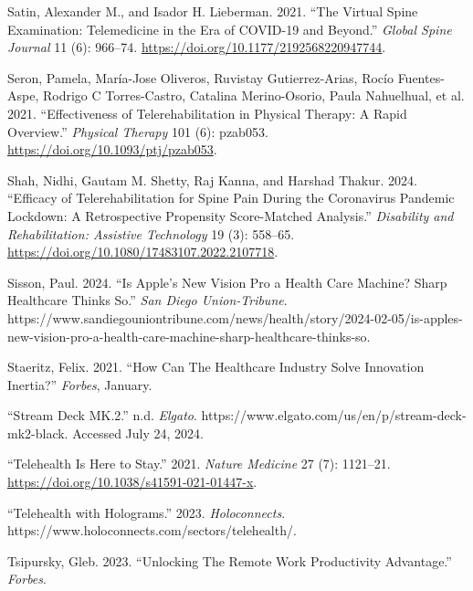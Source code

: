 \documentclass[
  letterpaper,
  DIV=11,
  numbers=noendperiod,
  oneside]{scrartcl}
\newlength{\cslhangindent}
\newenvironment{CSLReferences}[2] %
 {\begin{list}{}{%
  \setlength{\itemindent}{0pt}
  \setlength{\leftmargin}{0pt}
  \setlength{\parsep}{0pt}
  \ifodd #1
   \setlength{\leftmargin}{\cslhangindent}
   \setlength{\itemindent}{-1\cslhangindent}
  \fi
  \setlength{\itemsep}{#2\baselineskip}}}
 {\end{list}}
\begin{document}
\begin{CSLReferences}{1}{0}
Satin, Alexander M., and Isador H. Lieberman. 2021. {``The {Virtual
Spine Examination}: {Telemedicine} in the {Era} of {COVID-19} and
{Beyond}.''} \emph{Global Spine Journal} 11 (6): 966--74.
\url{https://doi.org/10.1177/2192568220947744}.

Seron, Pamela, María-Jose Oliveros, Ruvistay Gutierrez-Arias, Rocío
Fuentes-Aspe, Rodrigo C Torres-Castro, Catalina Merino-Osorio, Paula
Nahuelhual, et al. 2021. {``Effectiveness of {Telerehabilitation} in
{Physical Therapy}: {A Rapid Overview}.''} \emph{Physical Therapy} 101
(6): pzab053. \url{https://doi.org/10.1093/ptj/pzab053}.

Shah, Nidhi, Gautam M. Shetty, Raj Kanna, and Harshad Thakur. 2024.
{``Efficacy of Telerehabilitation for Spine Pain During the
{Coronavirus} Pandemic Lockdown: A Retrospective Propensity
Score-Matched Analysis.''} \emph{Disability and Rehabilitation:
Assistive Technology} 19 (3): 558--65.
\url{https://doi.org/10.1080/17483107.2022.2107718}.

Sisson, Paul. 2024. {``Is {Apple}'s New {Vision Pro} a Health Care
Machine? {Sharp Healthcare} Thinks So.''} \emph{San Diego
Union-Tribune}.
https://www.sandiegouniontribune.com/news/health/story/2024-02-05/is-apples-new-vision-pro-a-health-care-machine-sharp-healthcare-thinks-so.

Staeritz, Felix. 2021. {``How {Can The Healthcare Industry Solve
Innovation Inertia}?''} \emph{Forbes}, January.

{``Stream {Deck MK}.2.''} n.d. \emph{Elgato}.
https://www.elgato.com/us/en/p/stream-deck-mk2-black. Accessed July 24,
2024.

{``Telehealth Is Here to Stay.''} 2021. \emph{Nature Medicine} 27 (7):
1121--21. \url{https://doi.org/10.1038/s41591-021-01447-x}.

{``Telehealth with {Holograms}.''} 2023. \emph{Holoconnects}.
https://www.holoconnects.com/sectors/telehealth/.

Tsipursky, Gleb. 2023. {``Unlocking {The Remote Work Productivity
Advantage}.''} \emph{Forbes}.


\end{CSLReferences}
\end{document}
